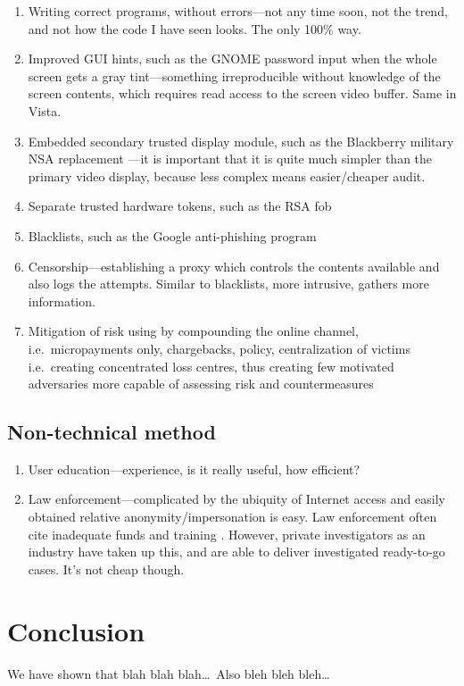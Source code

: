 \documentclass[10pt]{article}
\begin{document}
\begin{enumerate}
\item Writing correct programs, without errors---not any time soon, not the trend, and not how the code I have seen looks.  The only 100\% way.
\item Improved \textsc{GUI} hints, such as the GNOME password input when the whole screen gets a gray tint---something irreproducible without knowledge of the screen contents, which requires read access to the screen video buffer.  Same in Vista.
\item Embedded secondary trusted display module, such as the Blackberry military \textsc{NSA} replacement \cite{xxx}---it is important that it is quite much simpler than the primary video display, because less complex means easier/cheaper audit.
\item Separate trusted hardware tokens, such as the \textsc{RSA} fob \cite{xxx}
\item Blacklists, such as the Google anti-phishing program
\item Censorship—establishing a proxy which controls the contents available and also logs the attempts.  Similar to blacklists, more intrusive, gathers more information.
\item Mitigation of risk using by compounding the online channel, i.e.\ micropayments only, chargebacks, policy, centralization of victims i.e.\ creating concentrated loss centres, thus creating few motivated adversaries more capable of assessing risk and countermeasures
\end{enumerate}

%
%

\subsection{Non-technical method}
\begin{enumerate}
\item User education---experience, is it really useful, how efficient? \cite{xxx}
\item Law enforcement---complicated by the ubiquity of Internet access and easily obtained relative anonymity/impersonation is easy.  Law enforcement often cite inadequate funds and training \cite{xxx}.  However, private investigators as an industry have taken up this, and are able to deliver investigated ready-to-go cases.  It's not cheap though.
\end{enumerate}


%
%

\section{Conclusion}

We have shown that blah blah blah\ldots\, Also bleh bleh bleh\ldots

%
%


\end{document}
